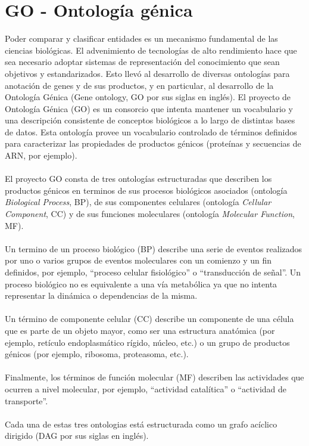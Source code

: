 \section{GO - Ontología génica}
\label{sec:go}
Poder comparar y clasificar entidades es un mecanismo fundamental de las ciencias biológicas. El advenimiento de tecnologías de alto rendimiento hace que sea necesario adoptar sistemas de representación del conocimiento que sean objetivos y estandarizados. Esto llevó al desarrollo de diversas ontologías para anotación de genes y de sus productos, y en particular, al desarrollo de la Ontología Génica (Gene ontology, GO por sus siglas en inglés).
El proyecto de Ontología Génica (GO) es un consorcio que intenta mantener un vocabulario y una descripción consistente de conceptos biológicos a lo largo de distintas bases de datos. Esta ontología provee un vocabulario controlado de términos definidos para caracterizar las propiedades de productos génicos (proteínas y secuencias de ARN, por ejemplo).\\\\
El proyecto GO consta de tres ontologías estructuradas que describen los productos génicos en terminos de sus procesos biológicos asociados (ontología \textit{Biological Process}, BP), de sus componentes celulares (ontología \textit{Cellular Component}, CC) y de sus funciones moleculares (ontología \textit{Molecular Function}, MF).\\\\
Un termino de un proceso biológico (BP) describe una serie de eventos realizados por uno o varios grupos de eventos moleculares con un comienzo y un fin definidos, por ejemplo, ``proceso celular fisiológico'' o ``transducción de señal''. Un proceso biológico no es equivalente a una vía metabólica ya que no intenta representar la dinámica o dependencias de la misma.\\\\
Un término de componente celular (CC) describe un componente de una célula que es parte de un objeto mayor, como ser una estructura anatómica (por ejemplo, retículo endoplasmático rígido, núcleo, etc.) o un grupo de productos génicos (por ejemplo, ribosoma, proteasoma, etc.).\\\\
Finalmente, los términos de función molecular (MF) describen las actividades que ocurren a nivel molecular, por ejemplo, ``actividad catalítica'' o ``actividad de transporte''.\\\\
Cada una de estas tres ontologias está estructurada como un grafo acíclico dirigido (DAG por sus siglas en inglés).\\\\
